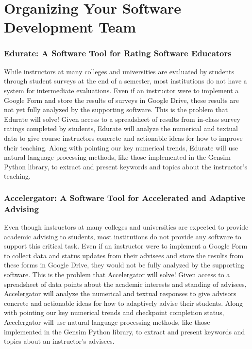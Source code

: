 \documentclass[11pt]{article}
\begin{document}
\section*{Organizing Your Software Development Team}


\subsubsection*{Edurate: A Software Tool for Rating Software Educators}

While instructors at many colleges and universities are evaluated by students through student surveys at the end of a
semester, most institutions do not have a system for intermediate evaluations. Even if an instructor were to implement a
Google Form and store the results of surveys in Google Drive, these results are not yet fully analyzed by the supporting
software. This is the problem that Edurate will solve! Given access to a spreadsheet of results from in-class survey
ratings completed by students, Edurate will analyze the numerical and textual data to give course instructors concrete
and actionable ideas for how to improve their teaching. Along with pointing our key numerical trends, Edurate will use
natural language processing methods, like those implemented in the Gensim Python library, to extract and present
keywords and topics about the instructor's teaching.

\vspace*{-.5em}

\subsubsection*{Accelergator: A Software Tool for Accelerated and Adaptive Advising}

Even though instructors at many colleges and universities are expected to provide academic advising to students, most
institutions do not provide any software to support this critical task. Even if an instructor were to implement a Google
Form to collect data and status updates from their advisees and store the results from these forms in Google Drive, they
would not be fully analyzed by the supporting software. This is the problem that Accelergator will solve! Given access
to a spreadsheet of data points about the academic interests and standing of advisees, Accelergator will analyze the
numerical and textual responses to give advisors concrete and actionable ideas for how to adaptively advise their
students. Along with pointing our key numerical trends and checkpoint completion status, Accelergator will use natural
language processing methods, like those implemented in the Gensim Python library, to extract and present keywords and
topics about an instructor's advisees.
\end{document}
